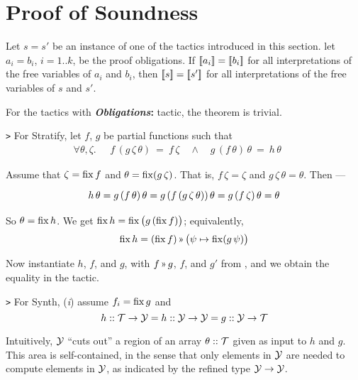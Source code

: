 \section{Proof of Soundness}
\label{annex:proof}

\renewenvironment{proof}{\noindent{\bf Proof.~}}{}

\begin{theorem}
Let $s=s'$ be an instance of one of the tactics introduced in this section.
let $a_i=b_i$, $i=1..k$, be the proof obligations. If $[\![{a_i}]\!]=[\![{b_i}]\!]$
for all interpretations of the free variables of $a_i$ and $b_i$, then
$[\![{s}]\!]=[\![{s'}]\!]$ for all interpretations of the free variables of $s$ and $s'$.
\end{theorem}

\begin{proof}
For the tactics with \textbf{\textit{Obligations}:} tactic, the theorem is trivial.

\medskip
\noindent
{\tt >} For {\sf Stratify}, let $f$, $g$ be partial functions such that
\vspace{-.5em}
\[\renewcommand\arraystretch{1.3}
  \forall \theta,\zeta.\quad \begin{array}{l}f\,(g\,\zeta\,\theta) ~=~ f\,\zeta \quad\land\quad
  g\,(f\,\theta)\,\theta ~=~ h\,\theta
  \end{array}\quad\]
  
Assume that $\zeta = \operatorname{fix} f$ and $\theta = \operatorname{fix} (g\,\zeta)$. 
That is, $f\,\zeta = \zeta$ and $g\,\zeta\,\theta = \theta$.
Then ---
\vspace{-.5em}
\[\renewcommand\arraystretch{1.3}
  \begin{array}{l@{}l}
   h\,\theta & {}= g\,(f\,\theta)\,\theta = g\,(f\,(g\,\zeta\,\theta))\,\theta =
              g\,(f\,\zeta)\,\theta = \theta
  \end{array}\]
  
\noindent
So $\theta = \operatorname{fix} h$. We get $\operatorname{fix} h = \operatorname{fix} \big(g \,(\operatorname{fix} f)\big)$; equivalently,
\[\fix h = (\fix f) \applt \big(\psi\mapsto\fix (g\,\psi)\big)\]

Now instantiate $h$, $f$, and $g$, with $f\applt g$, $f$, and $g'$ from ,
and we obtain the equality in the tactic.

\medskip
\noindent
{\tt >} For {\sf Synth}, ({\it i}) assume $f_i=\operatorname{fix} g$ and
\[h :: \mathcal{T}\to\mathcal{Y} = h :: \mathcal{Y}\to\mathcal{Y} = g :: \mathcal{Y}\to\mathcal{T}\]

Intuitively, $\mathcal{Y}$ ``cuts out'' a region of an array $\theta :: \mathcal{T}$ given
as input to $h$ and $g$. This area is self-contained, in the sense that
only elements in $\mathcal{Y}$ are needed to compute elements in $\mathcal{Y}$, as indicated
by the refined type $\mathcal{Y}\to\mathcal{Y}$.


\end{proof}
